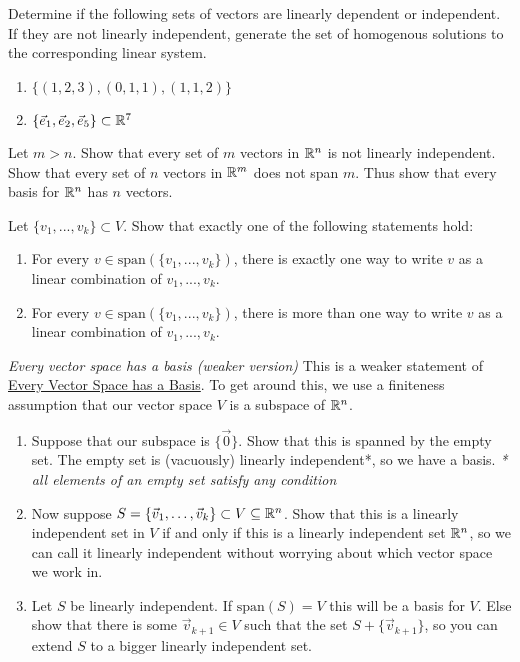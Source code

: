 \begin{exerciselist}
	\item Determine if the following sets of vectors are linearly dependent or independent. If they are not linearly independent, generate the set of homogenous solutions to the corresponding linear system. \begin{enumerate}[label=(\alph*)]
		\item $\{(1,2,3), (0,1,1),(1,1,2)\}$
		\item $\{\vec{e}_1,\vec{e}_2,\vec{e}_5\}\subset\mathbb{R}^7$
	\end{enumerate}
	\item Let $m>n$. Show that every set of $m$ vectors in $\mathbb{R}^n$ is not linearly independent. Show that every set of $n$ vectors in $\mathbb{R}^m$ does not span $m$. Thus show that every basis for $\mathbb{R}^n$ has $n$ vectors.
	\item Let $\{v_1,...,v_k\}\subset V$. Show that exactly one of the following statements hold: \begin{enumerate}[label=(\alph*)]
		\item For every $v\in \textrm{span}(\{v_1,...,v_k\})$, there is exactly one way to write $v$ as a linear combination of $v_1,...,v_k$.
		\item For every $v\in \textrm{span}(\{v_1,...,v_k\})$, there is more than one way to write $v$ as a linear combination of $v_1,...,v_k$.
	\end{enumerate}
	\item \textit{Every vector space has a basis (weaker version)} This is a weaker statement of \hyperref[thm:basisexists]{Every Vector Space has a Basis}. To get around this, we use a finiteness assumption that our vector space $V$ is a subspace of $\mathbb{R}^n$.\begin{enumerate}[label=(\alph*)]
		\item Suppose that our subspace is $\{\vec{0}\}$. Show that this is spanned by the empty set. The empty set is (vacuously) linearly independent*, so we have a basis. \textit{* all elements of an empty set satisfy any condition}
		\item Now suppose $S=\{\vec{v}_1,\ldots,\vec{v}_k\}\subset V\subseteq \mathbb{R}^n$. Show that this is a linearly independent set in $V$ if and only if this is a linearly independent set $\mathbb{R}^n$, so we can call it linearly independent without worrying about which vector space we work in.
		\item Let $S$ be linearly independent. If $\textrm{span}(S)=V$ this will be a basis for $V$. Else show that there is some $\vec{v}_{k+1}\in V$ such that the set $S+\{\vec{v}_{k+1}\}$, so you can extend $S$ to a bigger linearly independent set.

\end{enumerate}
\end{exerciselist}
